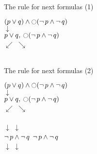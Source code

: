 \documentclass[style=simple,size=12pt]{powerdot}
\begin{document}
\begin{wideslide}[bm=,toc=]{The rule for next formulas (1)}
\begin{center}
$(p\vee q) \wedge \mathord{\ocircle} (\mathop{\neg} p \wedge \mathop{\neg} q)$\\
$\downarrow$ \\
$p\vee q,\: \mathord{\ocircle} (\mathop{\neg} p \wedge \mathop{\neg} q)$\\
$\swarrow$ \hspace{4em} $\searrow$ \\
\smallskip
{} \hspace{3em}
 \\
\end{center}
\end{wideslide}

\begin{wideslide}[bm=,toc=]{The rule for next formulas (2)}
\begin{center}
$(p\vee q) \wedge \mathord{\ocircle} (\mathop{\neg} p \wedge \mathop{\neg} q)$\\
$\downarrow$ \\
$p\vee q,\: \mathord{\ocircle} (\mathop{\neg} p \wedge \mathop{\neg} q)$\\
$\swarrow$ \hspace{4em} $\searrow$ \\
\smallskip
{} \hspace{3em}
 \\
\smallskip
$\downarrow$ \hspace{9em} $\downarrow$\\
\smallskip
$\mathop{\neg} p \wedge \mathop{\neg} q$ \hspace{6em} $\mathop{\neg} p \wedge \mathop{\neg} q$ \\ 
$\downarrow$ \hspace{9em} $\downarrow$\\
\smallskip
{} \hspace{6em} 
\end{center}
\end{wideslide}
\end{document}
